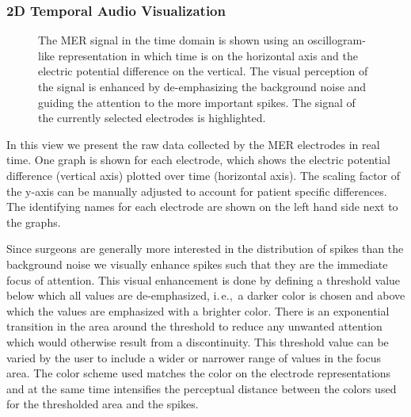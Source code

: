 \documentclass[review]{vgtc}                 %
\begin{document}
\subsubsection{2D Temporal Audio Visualization}\label{sec:overview:recording:mer}
\begin{figure}[b]
    \centering
    \caption{The MER signal in the time domain is shown using an oscillogram-like representation in which time is on the horizontal axis and the electric potential difference on the vertical. The visual perception of the signal is enhanced by de-emphasizing the background noise and guiding the attention to the more important spikes. The signal of the currently selected electrodes is highlighted.}
    \label{fig:recordingphase:sound}
\end{figure}

In this view we present the raw data collected by the MER electrodes in real time. One graph is shown for each electrode, which shows the electric potential difference (vertical axis) plotted over time (horizontal axis). The scaling factor of the y-axis can be manually adjusted to account for patient specific differences. The identifying names for each electrode are shown on the left hand side next to the graphs.

Since surgeons are generally more interested in the distribution of spikes than the background noise we visually enhance spikes such that they are the immediate focus of attention. This visual enhancement is done by defining a threshold value below which all values are de-emphasized, i.\,e.,~a darker color is chosen and above which the values are emphasized with a brighter color. There is an exponential transition in the area around the threshold to reduce any unwanted attention which would otherwise result from a discontinuity. This threshold value can be varied by the user to include a wider or narrower range of values in the focus area. The color scheme used matches the color on the electrode representations and at the same time intensifies the perceptual distance between the colors used for the thresholded area and the spikes.
\end{document}
